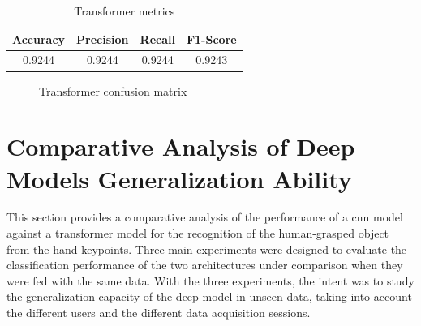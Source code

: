 \begin{table}[ht]
    \centering
    \caption{Transformer metrics}
    \label{table:transformer_dataset2_results}
    \begin{tabular}{cccc}
        \toprule
        Accuracy & Precision & Recall & F1-Score \\
        \midrule
        0.9244 & 0.9244 & 0.9244 & 0.9243 \\
        \bottomrule
    \end{tabular}
\end{table}

\begin{figure}[ht]
    \centering
    {\fontsize{10}{12}\selectfont}
    \caption{Transformer confusion matrix}
    \label{fig:transformer_dataset2_confusion_matrix}
\end{figure}

\section{Comparative Analysis of Deep Models Generalization Ability}
\label{section:comparative_analysis}

This section provides a comparative analysis of the performance of a \acs{cnn} model against a transformer model for the recognition of the human-grasped object from the hand keypoints. Three main experiments were designed to evaluate the classification performance of the two architectures under comparison when they were fed with the same data. With the three experiments, the intent was to study the generalization capacity of the deep model in unseen data, taking into account the different users and the different data acquisition sessions.

